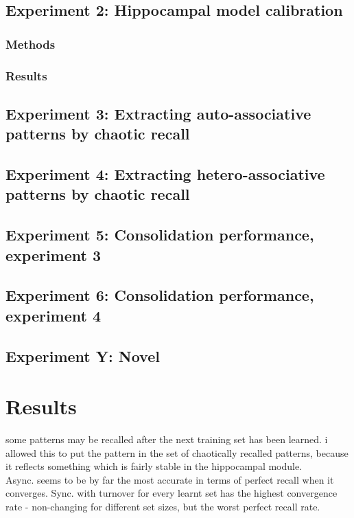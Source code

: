 \subsection{Experiment 2: Hippocampal model calibration}
\subsubsection{Methods}
\subsubsection{Results}

\subsection{Experiment 3: Extracting auto-associative patterns by chaotic recall}
\subsection{Experiment 4: Extracting hetero-associative patterns by chaotic recall}

\subsection{Experiment 5: Consolidation performance, experiment 3}
\subsection{Experiment 6: Consolidation performance, experiment 4}

\subsection{Experiment Y: Novel}


\section{Results}
some patterns may be recalled after the next training set has been learned. i allowed this to put the pattern in the set of chaotically recalled patterns, because it reflects something which is fairly stable in the hippocampal module.
\\

Async. seems to be by far the most accurate in terms of perfect recall when it converges. Sync. with turnover for every learnt set has the highest convergence rate - non-changing for different set sizes, but the worst perfect recall rate.

